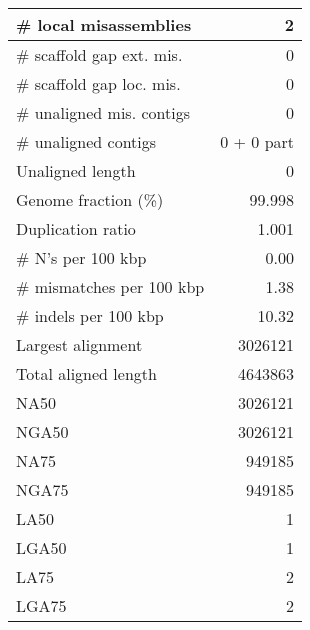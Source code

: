 \documentclass[12pt,a4paper]{article}
\begin{document}
\begin{table}[ht]
\begin{center}
\begin{tabular}{|l*{1}{|r}|}
\# local misassemblies & 2 \\ \hline
\# scaffold gap ext. mis. & 0 \\ \hline
\# scaffold gap loc. mis. & 0 \\ \hline
\# unaligned mis. contigs & 0 \\ \hline
\# unaligned contigs & 0 + 0 part \\ \hline
Unaligned length & 0 \\ \hline
Genome fraction (\%) & 99.998 \\ \hline
Duplication ratio & 1.001 \\ \hline
\# N's per 100 kbp & 0.00 \\ \hline
\# mismatches per 100 kbp & 1.38 \\ \hline
\# indels per 100 kbp & 10.32 \\ \hline
Largest alignment & 3026121 \\ \hline
Total aligned length & 4643863 \\ \hline
NA50 & 3026121 \\ \hline
NGA50 & 3026121 \\ \hline
NA75 & 949185 \\ \hline
NGA75 & 949185 \\ \hline
LA50 & 1 \\ \hline
LGA50 & 1 \\ \hline
LA75 & 2 \\ \hline
LGA75 & 2 \\ \hline
\end{tabular}
\end{center}
\end{table}
\end{document}

